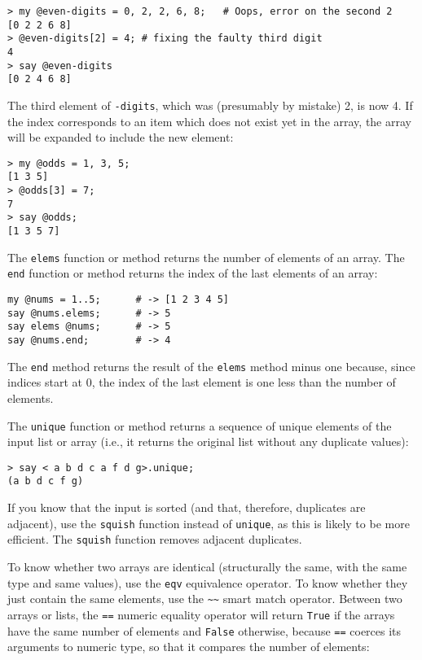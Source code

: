 \begin{verbatim}
> my @even-digits = 0, 2, 2, 6, 8;   # Oops, error on the second 2
[0 2 2 6 8]
> @even-digits[2] = 4; # fixing the faulty third digit
4
> say @even-digits
[0 2 4 6 8]
\end{verbatim}
%

The third element of {\tt \@even-digits}, which was  
(presumably by mistake) 2, is now 4. If the index corresponds 
to an item which does not exist yet in the array, the array 
will be expanded to include the new element:

\begin{verbatim}
> my @odds = 1, 3, 5;
[1 3 5]
> @odds[3] = 7;
7
> say @odds;
[1 3 5 7]
\end{verbatim}


The {\tt elems} function or method returns the number of 
elements of an array. The {\tt end} function or method 
returns the index of the last elements of an array:

\begin{verbatim}
my @nums = 1..5;      # -> [1 2 3 4 5]
say @nums.elems;      # -> 5
say elems @nums;      # -> 5
say @nums.end;        # -> 4
\end{verbatim}

The {\tt end} method returns the result of the {\tt elems} 
method minus one because, since indices start at 0, the 
index of the last element is one less than the number 
of elements.

The {\tt unique} function or method returns a sequence 
of unique elements of the input list or array (i.e., 
it returns the original list without any duplicate 
values):

\begin{verbatim}
> say < a b d c a f d g>.unique;
(a b d c f g)
\end{verbatim}

If you know that the input is sorted (and that, therefore, 
duplicates are adjacent), use the {\tt squish} function 
instead of {\tt unique}, as this is likely to be more 
efficient. The {\tt squish} function removes adjacent 
duplicates.

To know whether two arrays are identical (structurally the 
same, with the same type and same values), use the {\tt eqv} equivalence 
operator. To know whether they just contain the same elements, use 
the \verb'~~' smart match operator. Between two arrays or lists, the 
\verb'==' numeric equality operator will return {\tt True} if the 
arrays have the same number of elements and {\tt False} otherwise, 
because \verb'==' coerces its arguments to numeric type, so that 
it compares the number of elements:

